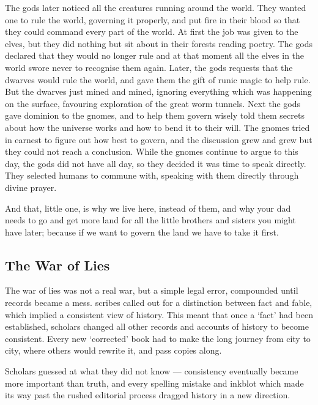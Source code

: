 \begin{multicols}{2}
\begin{exampletext}
  The gods later noticed all the creatures running around the world.
  They wanted one to rule the world, governing it properly, and put fire in their blood so that they could command every part of the world.
  At first the job was given to the elves, but they did nothing but sit about in their forests reading poetry.
  The gods declared that they would no longer rule and at that moment all the elves in the world swore never to recognise them again.
  Later, the gods requests that the dwarves would rule the world, and gave them the gift of runic magic to help rule.
  But the dwarves just mined and mined, ignoring everything which was happening on the surface, favouring exploration of the great worm tunnels.
  Next the gods gave dominion to the gnomes, and to help them govern wisely told them secrets about how the universe works and how to bend it to their will.
  The gnomes tried in earnest to figure out how best to govern, and the discussion grew and grew but they could not reach a conclusion.
  While the gnomes continue to argue to this day, the gods did not have all day, so they decided it was time to speak directly.
  They selected humans to commune with, speaking with them directly through divine prayer.

  And that, little one, is why we live here, instead of them, and why your dad needs to go and get more land for all the little brothers and sisters you might have later; because if we want to govern the land we have to take it first.
\fi

\end{exampletext}

\subsection{The War of Lies}
\label{warOfLies}

\begin{exampletext}
  \ifcase\value{r6}\relax\or
    The war of lies was not a real war, but a simple legal error, compounded until records became a mess.
    \Glspl{scribe} called out for a distinction between fact and fable, which implied a consistent view of history.
    This meant that once a `fact' had been established, scholars changed all other records and accounts of history to become consistent.
    Every new `corrected' book had to make the long journey from city to city, where others would rewrite it, and pass copies along.

    Scholars guessed at what they did not know --- consistency eventually became more important than truth, and every spelling mistake and inkblot which made its way past the rushed editorial process dragged history in a new direction.


\end{exampletext}
\end{multicols}
